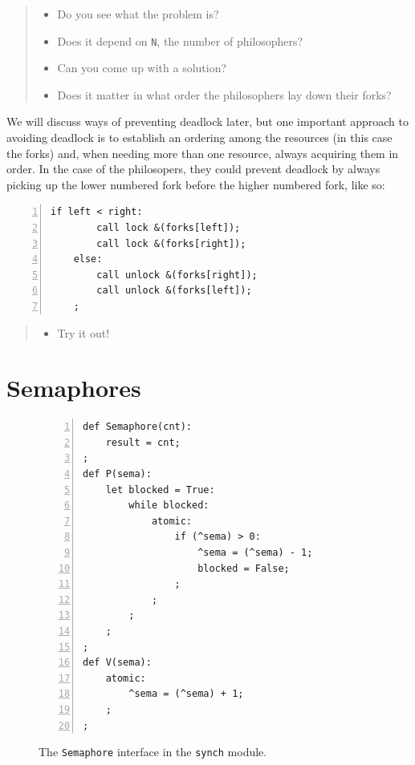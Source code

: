 \documentclass{report}
\newenvironment{code}{
\tcolorbox
}{
\endtcolorbox
}
\begin{document}
\begin{quote}
\begin{itemize}
\item Do you see what the problem is?
\item Does it depend on \texttt{N}, the number of philosophers?
\item Can you come up with a solution?
\item Does it matter in what order the philosophers lay down their forks?
\end{itemize}
\end{quote}

We will discuss ways of preventing deadlock later, but one important
approach to avoiding deadlock is to establish an ordering among the
resources (in this case the forks) and, when needing more than one
resource, always acquiring them in order.  In the case of the philosopers,
they could prevent deadlock by always picking up the lower numbered fork
before the higher numbered fork, like so:

\begin{code}
\begin{Verbatim}[xleftmargin=5mm,numbers=left]
    if left < right:
        call lock &(forks[left]);
        call lock &(forks[right]);
    else:
        call unlock &(forks[right]);
        call unlock &(forks[left]);
    ;
\end{Verbatim}
\end{code}

\begin{quote}
\begin{itemize}
\item Try it out!
\end{itemize}
\end{quote}

\chapter{Semaphores}

\begin{figure}
\begin{code}
\begin{Verbatim}[xleftmargin=5mm,numbers=left]
def Semaphore(cnt):
    result = cnt;
;
def P(sema):
    let blocked = True:
        while blocked:
            atomic:
                if (^sema) > 0:
                    ^sema = (^sema) - 1;
                    blocked = False;
                ;
            ;
        ;
    ;
;
def V(sema):
    atomic:
        ^sema = (^sema) + 1;
    ;
;
\end{Verbatim}
\end{code}
\caption{The \texttt{Semaphore} interface in the \texttt{synch} module.}
\label{fig:semaphore}
\end{figure}
\end{document}
